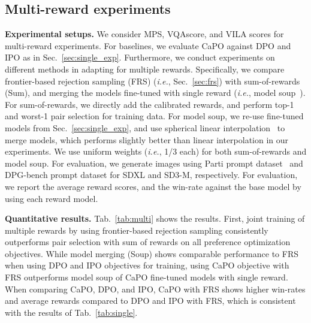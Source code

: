 \subsection{Multi-reward experiments}
\label{sec:exp_main}
\vspace{0.05in}
\noindent
{\bf Experimental setups.}
We consider MPS, VQAscore, and VILA scores for multi-reward experiments. 
For baselines, we evaluate CaPO against DPO and IPO as in Sec.~\ref{sec:single_exp}. 
Furthermore, we conduct experiments on different methods in adapting for multiple rewards. 
Specifically, we compare frontier-based rejection sampling (FRS) (\emph{i.e.}, Sec.~\ref{sec:frs}) with sum-of-rewards (Sum), and merging the models fine-tuned with single reward (\emph{i.e.}, model soup~\citep{wortsman2022model}). 
For sum-of-rewards, we directly add the calibrated rewards, and perform top-1 and worst-1 pair selection for training data. 
For model soup, we re-use fine-tuned models from Sec.~\ref{sec:single_exp}, and use spherical linear interpolation~\citep{shoemake1985animating, rame2024warp} to merge models, which performs slightly better than linear interpolation in our experiments. 
We use uniform weights (\emph{i.e.}, 1/3 each) for both sum-of-rewards and model soup.
For evaluation, we generate images using Parti prompt dataset~\citep{yu2022scaling} and DPG-bench prompt dataset for SDXL and SD3-M, respectively. 
For evaluation, we report the average reward scores, and the win-rate against the base model by using each reward model.

\vspace{1mm}
\noindent
{\bf Quantitative results.}
Tab.~\ref{tab:multi} shows the results. 
First, joint training of multiple rewards by using frontier-based rejection sampling consistently outperforms pair selection with sum of rewards on all preference optimization objectives.
While model merging (Soup) shows comparable performance to FRS when using DPO and IPO objectives for training, using CaPO objective with FRS outperforms model soup of CaPO fine-tuned models with single reward.
When comparing CaPO, DPO, and IPO, CaPO with FRS shows higher win-rates and average rewards compared to DPO and IPO with FRS, which is consistent with the results of Tab.~\ref{tab:single}.


